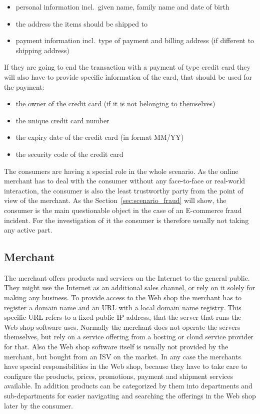 \begin{itemize}
		\item personal information incl.\ given name, family name and date of birth
		\item the address the items should be shipped to
		\item payment information incl.\ type of payment and billing address (if different to shipping address)
\end{itemize}

If they are going to end the transaction with a payment of type credit card they will also have to provide specific information of the card, that should be used for the payment:\@

\begin{itemize}
		\item the owner of the credit card (if it is not belonging to themselves)
		\item the unique credit card number
		\item the expiry date of the credit card (in format MM/YY)
		\item the security code of the credit card
\end{itemize}

The consumers are having a special role in the whole scenario. As the online merchant has to deal with the consumer without any face-to-face or real-world interaction, the consumer is also the least trustworthy party from the point of view of the merchant. As the Section~\ref{sec:scenario_fraud} will show, the consumer is the main questionable object in the case of an \gls{E-commerce} fraud incident. For the investigation of it the consumer is therefore usually not taking any active part.


\subsection{Merchant}
\label{subsec:stakeholder_merchant}

The merchant offers products and services on the Internet to the general public. They might use the Internet as an additional sales channel, or rely on it solely for making any business. To provide access to the Web shop the merchant has to register a domain name and an \gls{URL} with a local domain name registry. This specific \gls{URL} refers to a fixed public \gls{IP} address, that the server that runs the Web shop software uses. Normally the merchant does not operate the servers themselves, but rely on a service offering from a hosting or cloud service provider for that. Also the Web shop software itself is usually not provided by the merchant, but bought from an \gls{ISV} on the market. In any case the merchants have special responsibilities in the Web shop, because they have to take care to configure the products, prices, promotions, payment and shipment services available. In addition products can be categorized by them into departments and sub-departments for easier navigating and searching the offerings in the Web shop later by the consumer. \\

